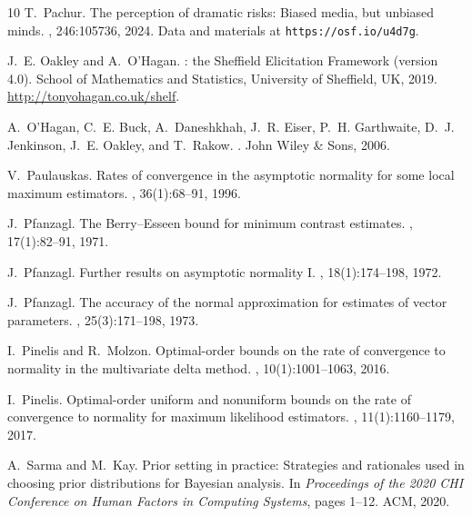 \documentclass[11pt]{article}
\theoremstyle{remark}
\begin{document}
\begin{thebibliography}{10}
T.~Pachur.
\newblock The perception of dramatic risks: Biased media, but unbiased minds.
, 246:105736, 2024.
\newblock Data and materials at \texttt{https://osf.io/u4d7g}.

J.~E. Oakley and A.~O'Hagan.
: the {S}heffield {E}licitation {F}ramework (version 4.0).
\newblock School of Mathematics and Statistics, University of Sheffield, UK,
  2019.
\newblock \url{http://tonyohagan.co.uk/shelf}.

A.~O'Hagan, C.~E. Buck, A.~Daneshkhah, J.~R. Eiser, P.~H. Garthwaite, D.~J.
  Jenkinson, J.~E. Oakley, and T.~Rakow.
.
\newblock John Wiley \& Sons, 2006.

V.~Paulauskas.
\newblock Rates of convergence in the asymptotic normality for some local
  maximum estimators.
, 36(1):68--91, 1996.

J.~Pfanzagl.
\newblock The {B}erry--{E}sseen bound for minimum contrast estimates.
, 17(1):82--91, 1971.

J.~Pfanzagl.
\newblock Further results on asymptotic normality {I}.
, 18(1):174--198, 1972.

J.~Pfanzagl.
\newblock The accuracy of the normal approximation for estimates of vector
  parameters.
, 25(3):171--198, 1973.

I.~Pinelis and R.~Molzon.
\newblock Optimal-order bounds on the rate of convergence to normality in the
  multivariate delta method.
, 10(1):1001--1063, 2016.

I.~Pinelis.
\newblock Optimal-order uniform and nonuniform bounds on the rate of
  convergence to normality for maximum likelihood estimators.
, 11(1):1160--1179, 2017.

A.~Sarma and M.~Kay.
\newblock Prior setting in practice: Strategies and rationales used in choosing
  prior distributions for {B}ayesian analysis.
\newblock In {\em Proceedings of the 2020 CHI Conference on Human Factors in
  Computing Systems}, pages 1--12. ACM, 2020.


\end{thebibliography}
\end{document}
